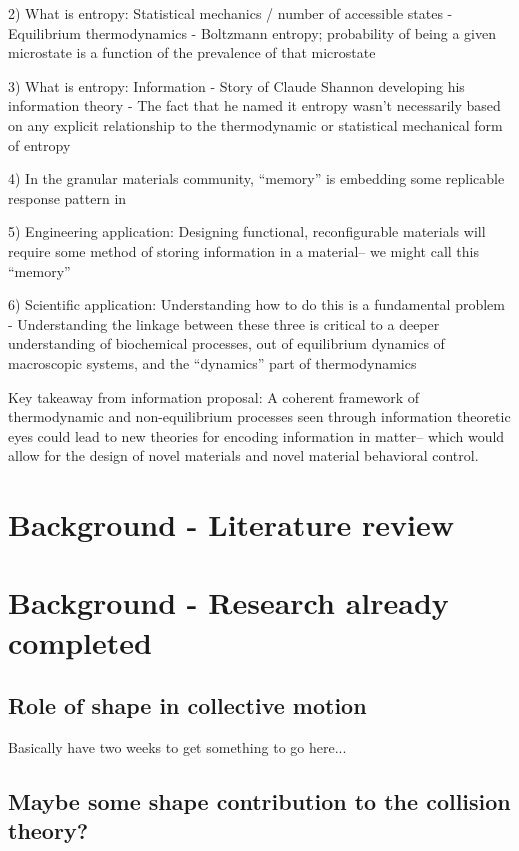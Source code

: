 \documentclass[11pt, oneside]{article}   	%
\begin{document}
2) What is entropy: Statistical mechanics / number of accessible states - Equilibrium thermodynamics
- Boltzmann entropy; probability of being a given microstate is a function of the prevalence of that microstate

3) What is entropy: Information
- Story of Claude Shannon developing his information theory
- The fact that he named it entropy wasn't necessarily based on any explicit relationship to the thermodynamic or statistical mechanical form of entropy

4) In the granular materials community, ``memory'' is embedding some replicable response pattern in 

5) Engineering application: Designing functional, reconfigurable materials will require some method of storing information in a material-- we might call this ``memory''

6) Scientific application: Understanding how to do this is a fundamental problem
- Understanding the linkage between these three is critical to a deeper understanding of biochemical processes, out of equilibrium dynamics of macroscopic systems, and the ``dynamics'' part of thermodynamics

Key takeaway from information proposal: A coherent framework of thermodynamic and non-equilibrium processes seen through information theoretic eyes could lead to new theories for encoding information in matter-- which would allow for the design of novel materials and novel material behavioral control.

\section{Background - Literature review}


\section{Background - Research already completed}
\subsection{Role of shape in collective motion}
Basically have two weeks to get something to go here...
\subsection{Maybe some shape contribution to the collision theory?}
\end{document}

